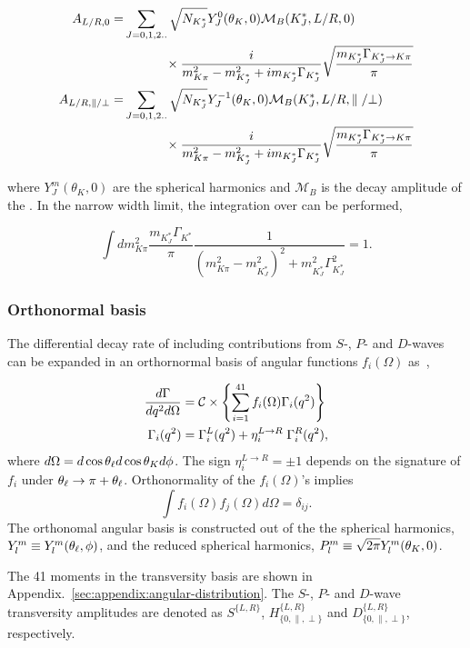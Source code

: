 \begin{equation}
\begin{aligned}
A_{L/R,0} =& \sum_{J=0,1,2..} \sqrt{N_{K^*_J}} Y^0_J(\theta_{K},0)\mathcal{M}_B(K^*_J,L/R,0) \\
& \hphantom{\sum_{J=0,1,2..}} \times \frac{i}{m^2_{K\pi}-m^2_{K_J^*}+im_{K_J^*}\Gamma_{K_J^*}}\sqrt{\frac{m_{K_J^*}\Gamma_{K_J^*\rightarrow K\pi}}{\pi}} \\
A_{L/R,\parallel/\bot} =& \sum_{J=0,1,2..} \sqrt{N_{K^*_J}} Y^{-1}_J(\theta_{K},0)\mathcal{M}_B(K^*_J,L/R,\parallel/\bot) \\
& \hphantom{\sum_{J=0,1,2..}} \times \frac{i}{m^2_{K\pi}-m^2_{K_J^*}+im_{K_J^*}\Gamma_{K_J^*}}\sqrt{\frac{m_{K_J^*}\Gamma_{K_J^*\rightarrow K\pi}}{\pi}} \\
\end{aligned}
\end{equation}

\noindent where $Y^m_J(\theta_{K},0)$ are the spherical harmonics and $\mathcal{M}_{B}$ is the decay amplitude of the . In the narrow width limit, the integration over \mkpi can be performed,

\begin{equation}
 \int dm_{K\pi}^{2}\frac{m_{K^{*}_{J}}\Gamma_{K^{*}}}{\pi}\frac{1}{(m_{K\pi}^{2}-m_{K^{*}_{J}}^{2})^{2} + m_{K^{*}_{J}}^{2}\Gamma_{K^{*}_{J}}^{2}} = 1.
\end{equation}

\subsubsection{Orthonormal basis}

The differential decay rate of \BdToKpimm including contributions from $S$-, $P$- and $D$-waves can be expanded in an orthornormal basis of angular functions $f_i(\Omega)$ as~\cite{biplab},

\begin{subequations}
\label{eqn:vector_moments}
\begin{align}
\frac{d\Gamma }{d{q^2} d\Omega} &= \mathcal{C} \times \left\{ \displaystyle \sum^{41}_{i=1} f_i (\Omega) \Gamma_i({q^2}) \right\} \label{eqn:vector_moments:1}\\
\Gamma_i({q^2}) &= \Gamma^L_i({q^2}) + \eta^{L\rightarrow R}_i\; \Gamma^R_i({q^2})\label{eqn:vector_moments:2},
\end{align}
\end{subequations}
\noindent where $d\Omega = d\cos{\theta_\ell} d\cos{\theta_K} d\phi$. The sign $\eta^{L\to R}_i=\pm 1$ depends on the signature of $f_i$ under $\theta_\ell \rightarrow \pi + \theta_\ell$. Orthonormality of the $f_i(\Omega)$'s implies
\begin{equation}
\int f_i(\Omega) f_j(\Omega) d \Omega = \delta_{ij}.
\end{equation}
The orthonomal angular basis is constructed out of the the spherical harmonics, \mbox{$Y^m_l \equiv Y^m_l (\theta_\ell,\phi)$}, and the reduced spherical harmonics, \mbox{${P^m_l \equiv \sqrt{2 \pi}Y^m_l(\theta_K,0)}$}. 

The 41 moments in the transversity basis are shown in Appendix.~\ref{sec:appendix:angular-distribution}.  The $S$-, $P$- and $D$-wave transversity amplitudes are denoted as $S^{\{L,R\}}$, $H^{\{L,R\}}_{\{0,\parallel,\perp\}}$ and $D^{\{L,R\}}_{\{0,\parallel,\perp\}}$, respectively.
